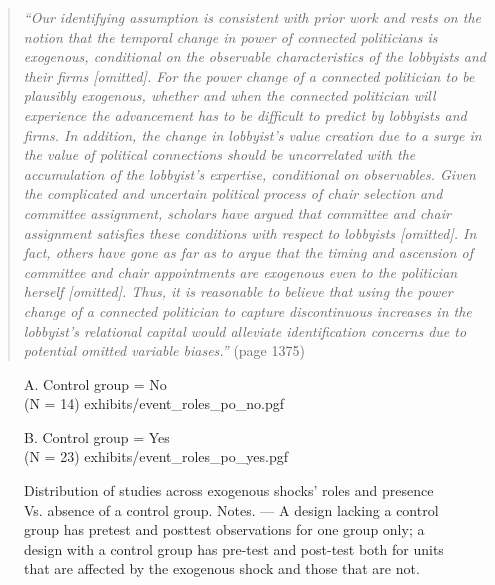 \documentclass[11pt]{article}
\begin{document}
\begin{refsection}
\begin{quote}
  \textit{
    ``Our identifying assumption is consistent with prior work and rests on the
    notion that the temporal change in power of connected politicians is
    exogenous, conditional on the observable characteristics of the lobbyists
    and their firms [omitted]. For the power change of a connected politician
to
    be plausibly exogenous, whether and when the connected politician will
    experience the advancement has to be difficult to predict by lobbyists and
    firms. In addition, the change in lobbyist's value creation due to a surge
    in the value of political connections should be uncorrelated with the
    accumulation of the lobbyist's expertise, conditional on observables. Given
    the complicated and uncertain political process of chair selection and
    committee assignment, scholars have argued that committee and chair
    assignment satisfies these conditions with respect to lobbyists [omitted].
    In fact, others have gone as far as to argue that the timing and ascension
    of committee and chair appointments are exogenous even to the politician
    herself [omitted]. Thus, it is reasonable to believe that using the power
    change of a connected politician to capture discontinuous increases in the
    lobbyist's relational capital would alleviate identification concerns due
to
    potential omitted variable biases.''
  }
  (page 1375)
\end{quote}

\begin{figure}[!htbp]
  \raggedleft
  \begin{small}
    \begin{minipage}{0.48\textwidth}
      \centering
      A. Control group = No\\(N = 14)
      \vspace{1.2em}
      {exhibits/event_roles_po_no.pgf}
    \end{minipage}\hfill
    \begin{minipage}{0.48\textwidth}
      \centering
      B. Control group = Yes\\(N = 23)
      {exhibits/event_roles_po_yes.pgf}
    \end{minipage}
    \caption{
      Distribution of studies across exogenous shocks' roles and presence Vs. absence of 
      a control group. Notes. --- A design lacking a control group has pretest and
      posttest observations for one group only; a design with a control group has
      pre-test and post-test both for units that are affected by the exogenous
      shock and those that are not.
    }
    \label{fig:potential_outcome}
  \end{small}
\end{figure}


\end{refsection}
\end{document}
